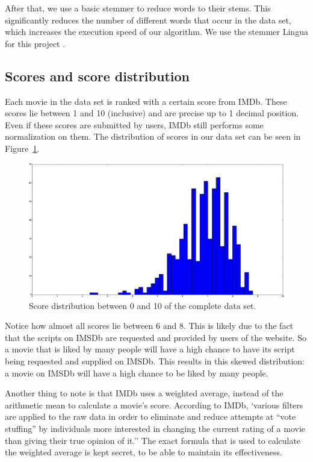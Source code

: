 \documentclass{article} %
\begin{document}
After that, we use a basic stemmer to reduce words to their stems.
This significantly reduces the number of different words that occur in the data set, which increases the execution speed of our algorithm. 
We use the stemmer Lingua for this project \cite{lingua}.

\subsection{Scores and score distribution}
Each movie in the data set is ranked with a certain score from IMDb.
These scores lie between 1 and 10 (inclusive) and are precise up to 1 decimal position.
Even if these scores are submitted by users, IMDb still performs some normalization on them.
The distribution of scores in our data set can be seen in Figure~\ref{fig:scorehist}.

\begin{figure}[ht!]
  \centering
  \includegraphics[width=\textwidth]{scores_histogram.png}
  \caption{Score distribution between 0 and 10 of the complete data set.}
  \label{fig:scorehist}
\end{figure}

Notice how almost all scores lie between 6 and 8.
This is likely due to the fact that the scripts on IMSDb are requested and provided by users of the website. 
So a movie that is liked by many people will have a high chance to have its script being requested and supplied on IMSDb.
This results in this skewed distribution: a movie on IMSDb will have a high chance to be liked by many people.

Another thing to note is that IMDb uses a weighted average, instead of the arithmetic mean to calculate a movie's score.
According to IMDb, `various filters are applied to the raw data in order to eliminate and reduce attempts at ``vote stuffing'' by individuals more interested in changing the current rating of a movie than giving their true opinion of it.''
The exact formula that is used to calculate the weighted average is kept secret, to be able to maintain its effectiveness. 
\end{document}
